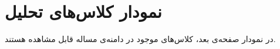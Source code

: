 \chapter{نمودار کلاس‌های تحلیل}
در نمودار صفحه‌ی بعد، کلاس‌های موجود در دامنه‌ی مساله قابل مشاهده هستند.